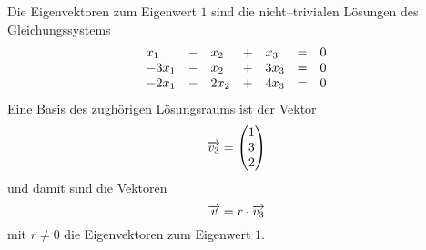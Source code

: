\begin{beispiel}
Die Eigenvektoren zum Eigenwert $1$ sind die nicht--trivialen Lösungen des 
Gleichungssystems
  	$$ \begin{array} {l c l c l c l}
  	x_1 & - & x_2 & + & x_3 & = & 0 \\
 	-3x_1 & - & x_2 & + & 3x_3 & = & 0 \\
 	-2x_1 & - & 2x_2 & + & 4x_3 & = & 0 
  	\end{array} $$
Eine Basis des zughörigen Lösungsraums ist der Vektor 
  	$$ \overrightarrow{v_3} = \left( \begin{matrix} 1 \\ 3 \\ 2 \end{matrix} \right) $$
und damit sind die Vektoren 
  	$$ \overrightarrow{v} = r \cdot \overrightarrow{v_3}$$
mit $r \neq 0$ die Eigenvektoren zum Eigenwert $1$.
\end{beispiel}

\medbreak

